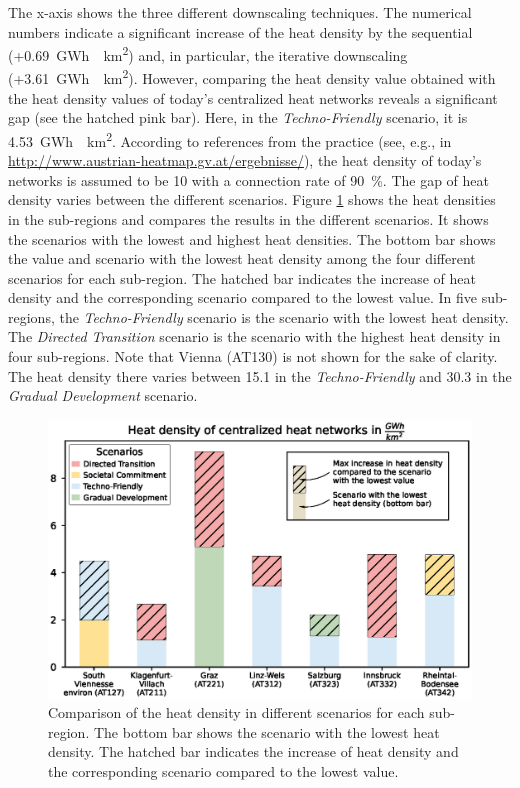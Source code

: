 The x-axis shows the three different downscaling techniques. The numerical numbers indicate a significant increase of the heat density by the sequential (+\SI{0.69}{GWh \per km^2}) and, in particular, the iterative downscaling (+\SI{3.61}{GWh \per km^2}). However, comparing the heat density value obtained with the heat density values of today's centralized heat networks reveals a significant gap (see the hatched pink bar). Here, in the \textit{Techno-Friendly} scenario, it is \SI{4.53}{GWh \per km^2}. According to references from the practice (see, e.g., in \url{http://www.austrian-heatmap.gv.at/ergebnisse/}), the heat density of today's networks is assumed to be \SI{10}{} with a connection rate of \SI{90}{\%}. The gap of heat density varies between the different scenarios. Figure \ref{fig:res4} shows the heat densities in the sub-regions and compares the results in the different scenarios. It shows the scenarios with the lowest and highest heat densities. The bottom bar shows the value and scenario with the lowest heat density among the four different scenarios for each sub-region. The hatched bar indicates the increase of heat density and the corresponding scenario compared to the lowest value. In five sub-regions, the \textit{Techno-Friendly} scenario is the scenario with the lowest heat density. The \textit{Directed Transition} scenario is the scenario with the highest heat density in four sub-regions. Note that Vienna (AT130) is not shown for the sake of clarity. The heat density there varies between \SI{15.1}{} in the \textit{Techno-Friendly} and \SI{30.3}{} in the \textit{Gradual Development} scenario.
 
\begin{figure}[h]
	\centering
	\includegraphics[width=1\linewidth]{figures/4_Results/Fig_benchmark/benchmark.eps}
	\caption{Comparison of the heat density in different scenarios for each sub-region. The bottom bar shows the scenario with the lowest heat density. The hatched bar indicates the increase of heat density and the corresponding scenario compared to the lowest value.}
	\label{fig:res4}
\end{figure}
